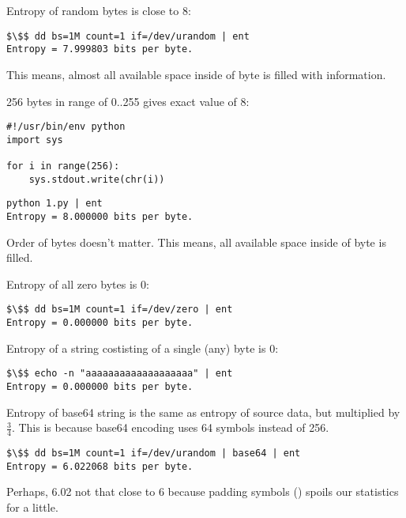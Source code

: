 Entropy of random bytes is close to 8:

\begin{lstlisting}[basicstyle=\ttfamily, mathescape]
$\$$ dd bs=1M count=1 if=/dev/urandom | ent
Entropy = 7.999803 bits per byte.
\end{lstlisting}

This means, almost all available space inside of byte is filled with information.

256 bytes in range of 0..255 gives exact value of 8:

\begin{lstlisting}[basicstyle=\ttfamily, mathescape]
#!/usr/bin/env python
import sys

for i in range(256):
    sys.stdout.write(chr(i))
\end{lstlisting}

\begin{lstlisting}[basicstyle=\ttfamily, mathescape]
python 1.py | ent
Entropy = 8.000000 bits per byte.
\end{lstlisting}

Order of bytes doesn't matter.
This means, all available space inside of byte is filled.

Entropy of all zero bytes is 0:

\begin{lstlisting}[basicstyle=\ttfamily, mathescape]
$\$$ dd bs=1M count=1 if=/dev/zero | ent
Entropy = 0.000000 bits per byte.
\end{lstlisting}

Entropy of a string costisting of a single (any) byte is 0:

\begin{lstlisting}[basicstyle=\ttfamily, mathescape]
$\$$ echo -n "aaaaaaaaaaaaaaaaaaa" | ent
Entropy = 0.000000 bits per byte.
\end{lstlisting}

Entropy of base64 string is the same as entropy of source data, but multiplied by $\frac{3}{4}$.
This is because base64 encoding uses 64 symbols instead of 256.

\begin{lstlisting}[basicstyle=\ttfamily, mathescape]
$\$$ dd bs=1M count=1 if=/dev/urandom | base64 | ent
Entropy = 6.022068 bits per byte.
\end{lstlisting}

Perhaps, 6.02 not that close to 6 because padding symbols (\TT{=}) spoils our statistics for a little.


